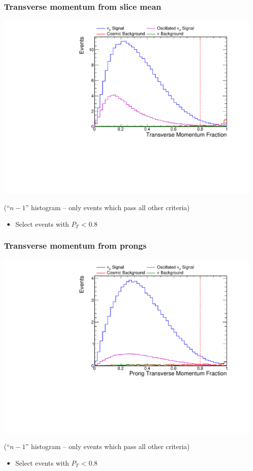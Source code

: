 \documentclass[10pt,professionalfonts,xcolor=table]{beamer}
\begin{document}
\begin{frame}
\frametitle{Transverse momentum from slice mean}

  \begin{center}
  \includegraphics[height=0.7\textwidth, angle=-90]{figures/selection/n1_tranMom.pdf}

  {\footnotesize(``$n-1$'' histogram -- only events which pass all other criteria)}
  \end{center}
  \begin{itemize}
  \item Select events with $P_T$ < 0.8
  \end{itemize}
\end{frame}

\begin{frame}
\frametitle{Transverse momentum from prongs}

  \begin{center}
  \includegraphics[height=0.7\textwidth, angle=-90]{figures/selection/n1_pngptp.pdf}

  {\footnotesize(``$n-1$'' histogram -- only events which pass all other criteria)}
  \end{center}
  \begin{itemize}
  \item Select events with $P_T$ < 0.8
  \end{itemize}
\end{frame}
\end{document}
